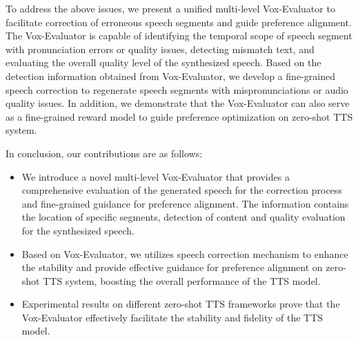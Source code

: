 \documentclass[letterpaper]{article} %
\begin{document}
To address the above issues, we present a unified multi-level Vox-Evaluator to facilitate correction of erroneous speech segments and guide preference alignment. The Vox-Evaluator is capable of identifying the temporal scope of speech segment with pronunciation errors or quality issues, detecting mismatch text, and evaluating the overall quality level of the synthesized speech. Based on the detection information obtained from Vox-Evaluator, we develop a fine-grained speech correction to regenerate speech segments with mispronunciations or audio quality issues. 
In addition, we demonstrate that the Vox-Evaluator can also serve as a fine-grained reward model to guide preference optimization on zero-shot TTS system.

In conclusion, our contributions are as follows: 
\begin{itemize}
\item We introduce a novel multi-level Vox-Evaluator that provides a comprehensive evaluation of the generated speech for the correction process and fine-grained guidance for preference alignment. The information contains the location of specific segments, detection of content and quality evaluation for the synthesized speech.
\item Based on Vox-Evaluator, we utilizes speech correction mechanism to enhance the stability and provide effective guidance for preference alignment on zero-shot TTS system, boosting the overall performance of the TTS model.
\item Experimental results on different zero-shot TTS frameworks prove that the Vox-Evaluator effectively facilitate the stability and fidelity of the TTS model.
\end{itemize}
\end{document}
